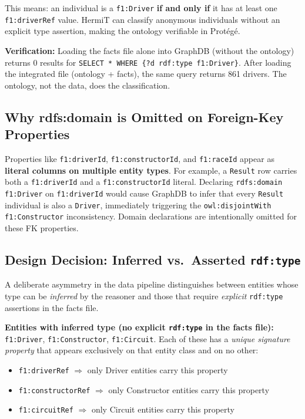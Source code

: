 \documentclass[12pt,a4paper]{article}
\begin{document}
This means: an individual is a \texttt{f1:Driver} \textbf{if and only if} it has
at least one \texttt{f1:driverRef} value. HermiT can classify anonymous individuals
without an explicit type assertion, making the ontology verifiable in Protégé.

\begin{infobox}
\textbf{Verification:} Loading the facts file alone into GraphDB (without the
ontology) returns 0 results for \texttt{SELECT * WHERE \{?d rdf:type f1:Driver\}}.
After loading the integrated file (ontology + facts), the same query returns 861 drivers.
The ontology, not the data, does the classification.
\end{infobox}

\subsection{Why rdfs:domain is Omitted on Foreign-Key Properties}

Properties like \texttt{f1:driverId}, \texttt{f1:constructorId}, and \texttt{f1:raceId}
appear as \textbf{literal columns on multiple entity types}. For example, a
\texttt{Result} row carries both a \texttt{f1:driverId} and a \texttt{f1:constructorId}
literal. Declaring \texttt{rdfs:domain f1:Driver} on \texttt{f1:driverId} would cause
GraphDB to infer that every \texttt{Result} individual is also a \texttt{Driver},
immediately triggering the \texttt{owl:disjointWith f1:Constructor} inconsistency.
Domain declarations are intentionally omitted for these FK properties.

\subsection{Design Decision: Inferred vs.\ Asserted \texttt{rdf:type}}
\label{sec:rdftype-decision}

A deliberate asymmetry in the data pipeline distinguishes between entities whose
type can be \emph{inferred} by the reasoner and those that require \emph{explicit}
\texttt{rdf:type} assertions in the facts file.

\textbf{Entities with inferred type (no explicit \texttt{rdf:type} in the facts file):}
\texttt{f1:Driver}, \texttt{f1:Constructor}, \texttt{f1:Circuit}.
Each of these has a \emph{unique signature property} that appears exclusively on that
entity class and on no other:

\begin{itemize}[leftmargin=1.5em]
  \item \texttt{f1:driverRef} $\Rightarrow$ only Driver entities carry this property
  \item \texttt{f1:constructorRef} $\Rightarrow$ only Constructor entities carry this property
  \item \texttt{f1:circuitRef} $\Rightarrow$ only Circuit entities carry this property
\end{itemize}
\end{document}

